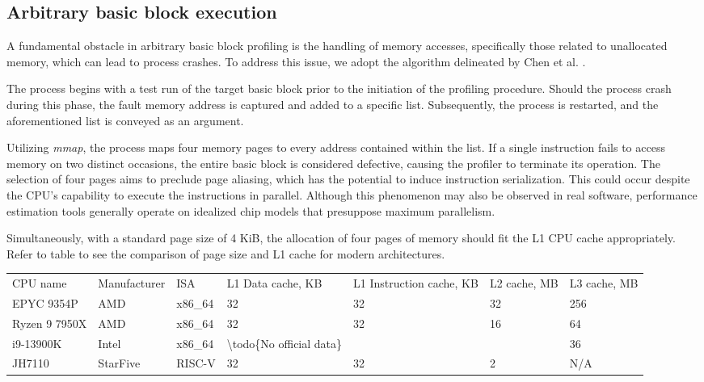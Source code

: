\subsection{Arbitrary basic block execution}

A fundamental obstacle in arbitrary basic block profiling is the handling of memory accesses, specifically those related to unallocated memory, which can lead to process crashes. To address this issue, we adopt the algorithm delineated by Chen et al. \cite{chenBHiveBenchmarkSuite2019}.

The process begins with a test run of the target basic block prior to the initiation of the profiling procedure. Should the process crash during this phase, the fault memory address is captured and added to a specific list. Subsequently, the process is restarted, and the aforementioned list is conveyed as an argument.

Utilizing \textit{mmap}, the process maps four memory pages to every address contained within the list. If a single instruction fails to access memory on two distinct occasions, the entire basic block is considered defective, causing the profiler to terminate its operation. The selection of four pages aims to preclude page aliasing, which has the potential to induce instruction serialization. This could occur despite the CPU's capability to execute the instructions in parallel. Although this phenomenon may also be observed in real software, performance estimation tools generally operate on idealized chip models that presuppose maximum parallelism.

Simultaneously, with a standard page size of 4 KiB, the allocation of four pages of memory should fit the L1 CPU cache appropriately. Refer to table  to see the comparison of page size and L1 cache for modern architectures.

\begin{table}[]
	\begin{tabular}{lllllll}
		CPU name      & Manufacturer & ISA     & L1 Data cache, KB                        & L1 Instruction cache, KB & L2 cache, MB & L3 cache, MB \\
		EPYC 9354P    & AMD          & x86\_64 & 32                                       & 32                       & 32           & 256          \\
		Ryzen 9 7950X & AMD          & x86\_64 & 32                                       & 32                       & 16           & 64           \\
		i9-13900K     & Intel        & x86\_64 & \textbackslash{}todo\{No official data\} &                          &              & 36           \\
		JH7110        & StarFive     & RISC-V  & 32                                       & 32                       & 2            & N/A
	\end{tabular}
\end{table}

